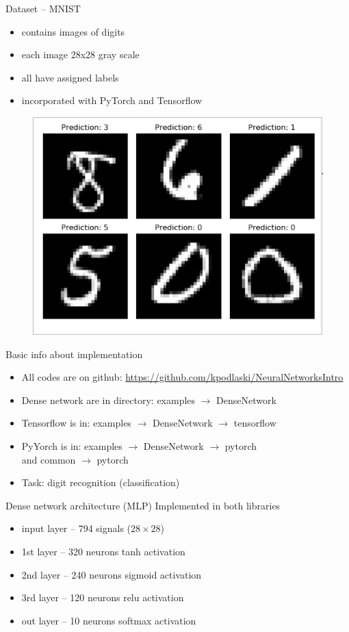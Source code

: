 \documentclass{beamer}%
\theoremstyle{definition}
\theoremstyle{definition}
\theoremstyle{example}
\theoremstyle{example}
\begin{document}
\begin{frame}{Dataset -- MNIST}
\begin{itemize}
\item contains images of digits
\item each image 28x28 gray scale
\item all have assigned labels
\item incorporated with PyTorch and Tensorflow
\end{itemize}
\begin{figure}
\centering
\includegraphics[width=.6\textwidth]{images/mnist.png}
\end{figure}
\end{frame}

\begin{frame}{Basic info about implementation}
\begin{itemize}
  \item All codes are on github: \url{https://github.com/kpodlaski/NeuralNetworksIntro}
  \item Dense network are in directory: examples $\rightarrow$ DenseNetwork
  \item Tensorflow is in: examples $\rightarrow$ DenseNetwork $\rightarrow$ tensorflow
  \item PyYorch is in: examples $\rightarrow$ DenseNetwork $\rightarrow$ pytorch \\and common $\rightarrow$ pytorch
  \item Task: digit recognition (classification)
\end{itemize}
\end{frame}


\begin{frame}{Dense network architecture (MLP)}
Implemented in both libraries
\begin{itemize}
  \item input layer -- 794 signals ($28\times28$)
  \item 1st layer -- 320 neurons tanh activation
  \item 2nd layer -- 240 neurons sigmoid activation
  \item 3rd layer -- 120 neurons relu activation
  \item out layer -- 10 neurons softmax activation
\end{itemize}
\end{frame}
\end{document}
